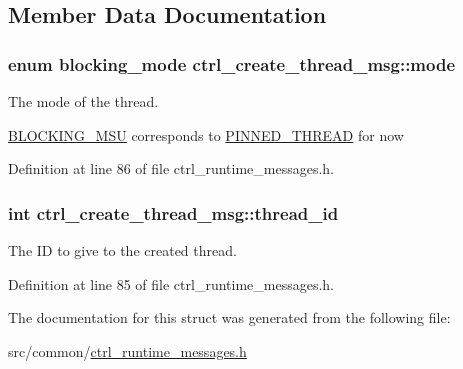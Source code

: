 \subsection{Member Data Documentation}
\hypertarget{structctrl__create__thread__msg_af74075761b9c8f46b619d33d4ef21c81}{
\subsubsection[{mode}]{\setlength{\rightskip}{0pt plus 5cm}enum {\bf blocking\-\_\-mode} ctrl\-\_\-create\-\_\-thread\-\_\-msg\-::mode}}\label{structctrl__create__thread__msg_af74075761b9c8f46b619d33d4ef21c81}


The mode of the thread. 

\hyperlink{dfg_8h_af31ca3002c5b769551da6f1183bafed5a3e9aecc35fdf55d99ab9e876cce4411c}{B\-L\-O\-C\-K\-I\-N\-G\-\_\-\-M\-S\-U} corresponds to \hyperlink{dfg_8h_a673ccd9aadafd31e8beaf16423c07db2ad7379b426f921781afd49485009640f0}{P\-I\-N\-N\-E\-D\-\_\-\-T\-H\-R\-E\-A\-D} for now 

Definition at line 86 of file ctrl\-\_\-runtime\-\_\-messages.\-h.

\hypertarget{structctrl__create__thread__msg_a930a1b6ad3d62f876fa6ce4a44f2daf1}{
\subsubsection[{thread\-\_\-id}]{\setlength{\rightskip}{0pt plus 5cm}int ctrl\-\_\-create\-\_\-thread\-\_\-msg\-::thread\-\_\-id}}\label{structctrl__create__thread__msg_a930a1b6ad3d62f876fa6ce4a44f2daf1}


The I\-D to give to the created thread. 



Definition at line 85 of file ctrl\-\_\-runtime\-\_\-messages.\-h.



The documentation for this struct was generated from the following file\-:\begin{DoxyCompactItemize}
\item 
src/common/\hyperlink{ctrl__runtime__messages_8h}{ctrl\-\_\-runtime\-\_\-messages.\-h}\end{DoxyCompactItemize}
